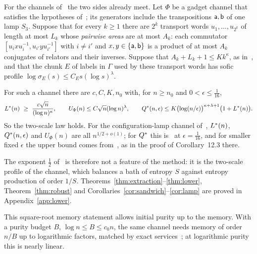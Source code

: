 For the channels of~\cite{DouglasMghirbiC} the two sides already meet. Let $\Phi$ be a gadget channel that satisfies the
hypotheses of~\cite[Theorem~10.1]{DouglasMghirbiC}; its generators include the transpositions $\mathsf a,\mathsf b$ of one lamp $S_3$.
Suppose that for every $k\geq1$ there are $2^k$ transport words $u_1,\dots,u_{2^k}$ of length at most $L_k$ whose
\emph{pairwise areas} are at most $A_k$: each commutator $[u_ixu_i^{-1},u_{i'}yu_{i'}^{-1}]$ with $i\ne i'$ and
$x,y\in\{\mathsf a,\mathsf b\}$ is a product of at most $A_k$ conjugates of relators and their inverses. Suppose that
$A_k+L_k+1\le Kk^\kappa$, as in~\cite[Corollary~10.2(a)]{DouglasMghirbiC}, and that the chunk $E$ of labels in $\Gamma$
used by these transport words has sofic profile $\log\sigma_E(s)\le C_Es(\log s)^\lambda$.

\begin{corollary}\label{cor:lamp}
For such a channel there are $c,C,K,n_0$ with, for $n\ge n_0$ and $0<\epsilon\le\frac1{16}$,
\[
L^{*}(n)\ \ge\ \frac{c\sqrt n}{(\log n)^\kappa},\qquad U_\Phi(n)\le C\sqrt n(\log n)^\lambda,\qquad
Q^{*}(n,\epsilon)\le K\bigl(\log(n/\epsilon)\bigr)^{\kappa+\lambda+1}\bigl(1+L^{*}(n)\bigr).
\]
So the two-scale law holds. For the configuration-lamp channel of~\cite[Section~11]{DouglasMghirbiC}, $L^{*}(n)$, $Q^{*}(n,\epsilon)$ and $U_\Phi(n)$ are all
$n^{1/2+o(1)}$; for $Q^{*}$ this is~\cite[Theorem~11.1(b) and Corollary~12.3]{DouglasMghirbiC} at $\epsilon=\frac1{16}$, and for smaller fixed
$\epsilon$ the upper bound comes from~\cite[Theorem~12.2]{DouglasMghirbiC}, as in the proof of Corollary~12.3 there.
\end{corollary}

The exponent $\frac12$ of~\cite[Theorem~11.1(b)]{DouglasMghirbiC} is therefore not a feature of the method: it is the two-scale profile of the
channel, which balances a bath of entropy $S$ against entropy production of order $1/S$. Theorems~\ref{thm:extraction}--\ref{thm:lower},
Theorem~\ref{thm:robust} and Corollaries~\ref{cor:sandwich}--\ref{cor:lamp} are proved in Appendix~\ref{app:lower}.

This square-root memory statement allows initial purity up to the memory. With a purity budget $B$,
$\log n\le B\le c_0n$, the same channel needs memory of order $n/B$ up to logarithmic factors, matched by exact
services~\cite[Theorem~11.1(a)]{DouglasMghirbiC}; at logarithmic purity this is nearly linear.
